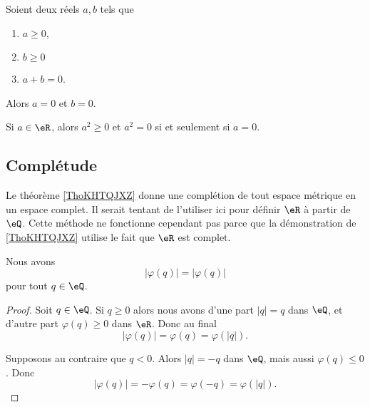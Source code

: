 \begin{lemma}       \label{LEMooTPLUooXiCZHJ}
    Soient deux réels \( a,b\) tels que
    \begin{enumerate}
        \item
            \( a\geq 0\),
        \item
            \( b\geq 0\)
        \item
            \( a+b=0\).
    \end{enumerate}
    Alors \( a=0\) et \( b=0\).
\end{lemma}

\begin{lemma}       \label{LEMooNLGSooSGdvAo}
    Si \( a\in \eR\), alors \( a^2\geq 0\) et \( a^2=0\) si et seulement si \( a=0\).
\end{lemma}

\subsection{Complétude}

Le théorème \ref{ThoKHTQJXZ} donne une complétion de tout espace métrique en un espace complet. Il serait tentant de l'utiliser ici pour définir \( \eR\) à partir de \( \eQ\). Cette méthode ne fonctionne cependant pas parce que la démonstration de \ref{ThoKHTQJXZ} utilise le fait que \( \eR\) est complet.

\begin{lemma}       \label{LEMooXCVRooOSZYWv}
    Nous avons
    \begin{equation}
        | \varphi(q) |=| \varphi(q) |
    \end{equation}
    pour tout \( q\in \eQ\).
\end{lemma}

\begin{proof}
    Soit \( q\in \eQ\). Si \( q\geq 0\) alors nous avons d'une part \( | q |=q\) dans \( \eQ\), et d'autre part \( \varphi(q)\geq 0\) dans \( \eR\). Donc au final
    \begin{equation}
        | \varphi(q) |=\varphi(q)=\varphi(| q |).
    \end{equation}
    
    Supposons au contraire que \( q<0\). Alors \( | q |=-q\) dans \( \eQ\), mais aussi \( \varphi(q)\leq 0\). Donc
    \begin{equation}
        | \varphi(q) |=-\varphi(q)=\varphi(-q)=\varphi(| q |).
    \end{equation}
\end{proof}

